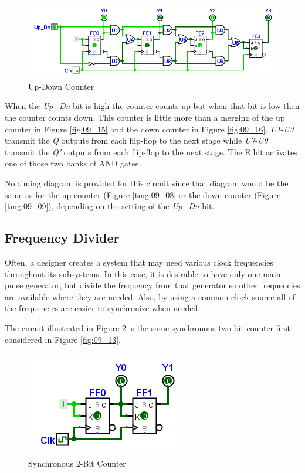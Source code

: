\begin{figure}[H]
	\centering
	\includegraphics[width=\maxwidth{.95\linewidth}]{gfx/09_20}
	\caption{Up-Down Counter}
	\label{fig:09_20}
\end{figure}

When the \emph{Up\_Dn} bit is high the counter counts up but when that bit is low then the counter counts down. This counter is little more than a merging of the up counter in Figure \ref{fig:09_15} and the down counter in Figure \ref{fig:09_16}. \emph{U1}-\emph{U3} transmit the \emph{Q} outputs from each flip-flop to the next stage while \emph{U7}-\emph{U9} transmit the \emph{Q'} outputs from each flip-flop to the next stage. The E bit activates one of those two banks of \textsf{AND} gates.

No timing diagram is provided for this circuit since that diagram would be the same as for the up counter (Figure \ref{tmg:09_08} or the down counter (Figure \ref{tmg:09_09}), depending on the setting of the \emph{Up\_Dn} bit.

\subsection{Frequency Divider}
\label{SL:subsec:frequency_divider}

Often, a designer creates a system that may need various clock frequencies throughout its subsystems. In this case, it is desirable to have only one main pulse generator, but divide the frequency from that generator so other frequencies are available where they are needed. Also, by using a common clock source all of the frequencies are easier to synchronize when needed.

The circuit illustrated in Figure \ref{fig:09_21} is the same synchronous two-bit counter first considered in Figure \ref{fig:09_13}.

\begin{figure}[H]
	\centering
	\includegraphics[width=\maxwidth{.95\linewidth}]{gfx/09_21}
	\caption{Synchronous 2-Bit Counter}
	\label{fig:09_21}
\end{figure}

